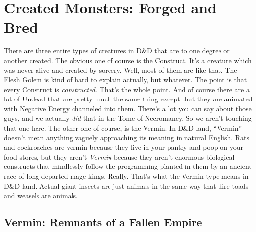 \chapter{Created Monsters: Forged and Bred}
\vspace*{-8pt}

There are three entire types of creatures in D\&D that are to one degree or another created. The obvious one of course is the Construct. It's a creature which was never alive and created by sorcery. Well, most of them are like that. The Flesh Golem is kind of hard to explain actually, but whatever. The point is that every Construct is \emph{constructed}. That's the whole point. And of course there are a lot of Undead that are pretty much the same thing except that they are animated with Negative Energy channeled into them. There's a lot you can say about those guys, and we actually \emph{did} that in the Tome of Necromancy. So we aren't touching that one here. The other one of course, is the Vermin. In D\&D land, ``Vermin'' doesn't mean anything vaguely approaching its meaning in natural English. Rats and cockroaches are vermin because they live in your pantry and poop on your food stores, but they aren't \emph{Vermin} because they aren't enormous biological constructs that mindlessly follow the programming planted in them by an ancient race of long departed mage kings. Really. That's what the Vermin type means in D\&D land. Actual giant insects are just animals in the same way that dire toads and weasels are animals.

\section{Vermin: Remnants of a Fallen Empire}
\vspace*{-8pt}


